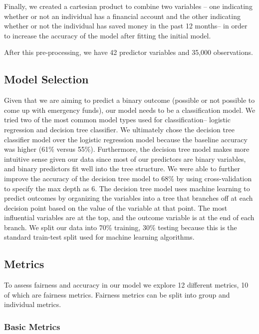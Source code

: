 \documentclass[water,article,submit,moreauthors,pdftex]{mdpi}
\begin{document}
Finally, we created a cartesian product to combine two variables -- one
indicating whether or not an individual has a financial account and the
other indicating whether or not the individual has saved money in the
past 12 months-- in order to increase the accuracy of the model after
fitting the initial model.

After this pre-processing, we have 42 predictor variables and 35,000
observations.

\hypertarget{model-selection}{%
\subsection{Model Selection}\label{model-selection}}

Given that we are aiming to predict a binary outcome (possible or not
possible to come up with emergency funds), our model needs to be a
classification model. We tried two of the most common model types used
for classification-- logistic regression and decision tree classifier.
We ultimately chose the decision tree classifier model over the logistic
regression model because the baseline accuracy was higher (61\% versus
55\%). Furthermore, the decision tree model makes more intuitive sense
given our data since most of our predictors are binary variables, and
binary predictors fit well into the tree structure. We were able to
further improve the accuracy of the decision tree model to 68\% by using
cross-validation to specify the max depth as 6. The decision tree model
uses machine learning to predict outcomes by organizing the variables
into a tree that branches off at each decision point based on the value
of the variable at that point. The most influential variables are at the
top, and the outcome variable is at the end of each branch. We split our
data into 70\% training, 30\% testing because this is the standard
train-test split used for machine learning algorithms.

\hypertarget{metrics}{%
\subsection{Metrics}\label{metrics}}

To assess fairness and accuracy in our model we explore 12 different
metrics, 10 of which are fairness metrics. Fairness metrics can be split
into group and individual metrics.

\hypertarget{basic-metrics}{%
\subsubsection{Basic Metrics}\label{basic-metrics}}
\end{document}
